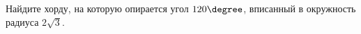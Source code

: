 \begin{ex}
	\begin{condition}
		Найдите хорду, на которую опирается угол \( 120\degree \), вписанный в окружность радиуса \( 2\sqrt{3} \).
	\end{condition}
\end{ex}
